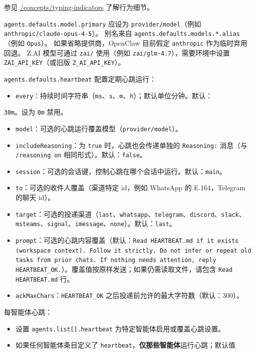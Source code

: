 参见 \href{/concepts/typing-indicators}{/concepts/typing-indicators} 了解行为细节。

\texttt{agents.defaults.model.primary} 应设为 \texttt{provider/model}（例如 \texttt{anthropic/claude-opus-4-5}）。
别名来自 \texttt{agents.defaults.models.*.alias}（例如 \texttt{Opus}）。
如果省略提供商，OpenClaw 目前假定 \texttt{anthropic} 作为临时弃用回退。
Z.AI 模型可通过 \texttt{zai/} 使用（例如 \texttt{zai/glm-4.7}），需要环境中设置
\texttt{ZAI\_API\_KEY}（或旧版 \texttt{Z\_AI\_API\_KEY}）。

\texttt{agents.defaults.heartbeat} 配置定期心跳运行：

\begin{itemize}
  \item \texttt{every}：持续时间字符串（\texttt{ms}、\texttt{s}、\texttt{m}、\texttt{h}）；默认单位分钟。默认：
\end{itemize}

\texttt{30m}。设为 \texttt{0m} 禁用。
\begin{itemize}
  \item \texttt{model}：可选的心跳运行覆盖模型（\texttt{provider/model}）。
  \item \texttt{includeReasoning}：为 \texttt{true} 时，心跳也会传递单独的 \texttt{Reasoning:} 消息（与 \texttt{/reasoning on} 相同形式）。默认：\texttt{false}。
  \item \texttt{session}：可选的会话键，控制心跳在哪个会话中运行。默认：\texttt{main}。
  \item \texttt{to}：可选的收件人覆盖（渠道特定 id，例如 WhatsApp 的 E.164，Telegram 的聊天 id）。
  \item \texttt{target}：可选的投递渠道（\texttt{last}、\texttt{whatsapp}、\texttt{telegram}、\texttt{discord}、\texttt{slack}、\texttt{msteams}、\texttt{signal}、\texttt{imessage}、\texttt{none}）。默认：\texttt{last}。
  \item \texttt{prompt}：可选的心跳内容覆盖（默认：\texttt{Read HEARTBEAT.md if it exists (workspace context). Follow it strictly. Do not infer or repeat old tasks from prior chats. If nothing needs attention, reply HEARTBEAT\_OK.}）。覆盖值按原样发送；如果仍需读取文件，请包含 \texttt{Read HEARTBEAT.md} 行。
  \item \texttt{ackMaxChars}：\texttt{HEARTBEAT\_OK} 之后投递前允许的最大字符数（默认：300）。
\end{itemize}


每智能体心跳：

\begin{itemize}
  \item 设置 \texttt{agents.list[].heartbeat} 为特定智能体启用或覆盖心跳设置。
  \item 如果任何智能体条目定义了 \texttt{heartbeat}，\textbf{仅那些智能体}运行心跳；默认值
\end{itemize}

